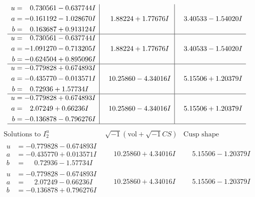 \documentclass[1p]{elsarticle_modified}
\theoremstyle{definition}
\newcommand{\I}{\sqrt{-1}}
\begin{document}
$$\begin{array}{c|c|c}
\begin{aligned}
u &= \phantom{-}0.730561 - 0.637744 I \\
a &= -0.161192 - 1.028670 I \\
b &= \phantom{-}0.163687 + 0.913124 I\end{aligned}
 & \phantom{-}1.88224 + 1.77676 I & \phantom{-}3.40533 - 1.54020 I \\ \hline\begin{aligned}
u &= \phantom{-}0.730561 - 0.637744 I \\
a &= -1.091270 - 0.713205 I \\
b &= -0.624504 + 0.895096 I\end{aligned}
 & \phantom{-}1.88224 + 1.77676 I & \phantom{-}3.40533 - 1.54020 I \\ \hline\begin{aligned}
u &= -0.779828 + 0.674893 I \\
a &= -0.435770 - 0.013571 I \\
b &= \phantom{-}0.72936 + 1.57734 I\end{aligned}
 & \phantom{-}10.25860 - 4.34016 I & \phantom{-}5.15506 + 1.20379 I \\ \hline\begin{aligned}
u &= -0.779828 + 0.674893 I \\
a &= \phantom{-}2.07249 + 0.66236 I \\
b &= -0.136878 - 0.796276 I\end{aligned}
 & \phantom{-}10.25860 - 4.34016 I & \phantom{-}5.15506 + 1.20379 I\\
 \hline 
 \end{array}$$\newpage$$\begin{array}{c|c|c}  
\text{Solutions to }I^u_{2}& \I (\text{vol} + \sqrt{-1}CS) & \text{Cusp shape}\\
 \hline 
\begin{aligned}
u &= -0.779828 - 0.674893 I \\
a &= -0.435770 + 0.013571 I \\
b &= \phantom{-}0.72936 - 1.57734 I\end{aligned}
 & \phantom{-}10.25860 + 4.34016 I & \phantom{-}5.15506 - 1.20379 I \\ \hline\begin{aligned}
u &= -0.779828 - 0.674893 I \\
a &= \phantom{-}2.07249 - 0.66236 I \\
b &= -0.136878 + 0.796276 I\end{aligned}
 & \phantom{-}10.25860 + 4.34016 I & \phantom{-}5.15506 - 1.20379 I \\ \hline\begin{aligned}

\end{aligned}
\end{array}$$
\end{document}
